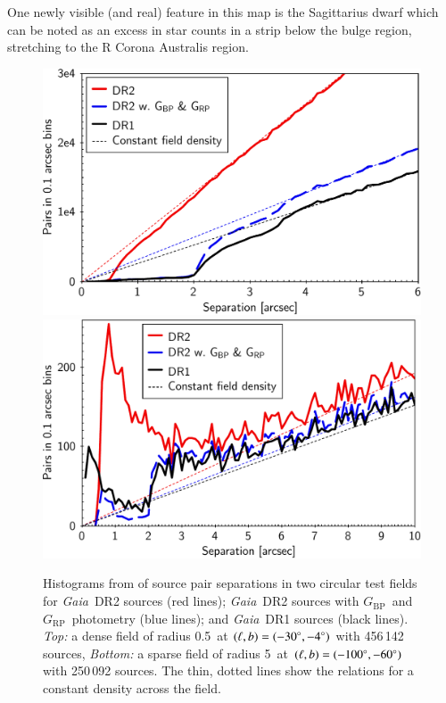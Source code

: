 \documentclass[longauth]{aa_gaia} %
\newcommand\gaia{\textit{Gaia}}
\newcommand\gdr[1]{\gaia~DR#1}
\newcommand\gbp{\ensuremath{G_\mathrm{BP}}}
\newcommand\grp{\ensuremath{G_\mathrm{RP}}}
\begin{document}
One newly visible (and real) feature in this map is the Sagittarius dwarf which can be noted as an
excess in star counts in a strip below the bulge region, stretching to the R Corona Australis
region.

\begin{figure}[t]
  \begin{center}
    \includegraphics[width=0.9\columnwidth]{figures/source_pairs_dense_field.pdf}\\[3mm]
    \includegraphics[width=0.9\columnwidth]{figures/source_pairs_sparse_field.pdf}
    \caption{Histograms from \cite{DR2-DPACP-39} of source pair separations in two circular test
      fields for \gdr{2} sources (red lines); \gdr{2} sources with \gbp\ and \grp\ photometry (blue
      lines); and \gdr{1} sources (black lines). {\em Top:} a dense field of radius 0.5\degr\ at
      $(\ell,b) = (-30^\circ,-4^\circ)$ with 456\,142 sources, {\em Bottom:} a sparse field of radius
      5\degr\ at $(\ell,b) = (-100^\circ,-60^\circ)$ with 250\,092 sources. The thin, dotted lines
    show the relations for a constant density across the field.\label{fig:pairstat}}
  \end{center}
\end{figure}
\end{document}
